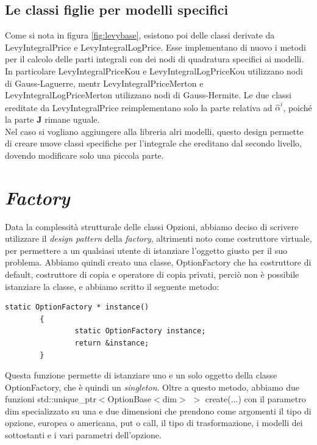 \documentclass[a4paper,10pt]{report}
\theoremstyle{plain}
\theoremstyle{definition}
\theoremstyle{remark}
\begin{document}
\subsection{Le classi figlie per modelli specifici}

Come si nota in figura \ref{fig:levybase}, esistono poi delle classi derivate da \textsf{LevyIntegralPrice} e \textsf{LevyIntegralLogPrice}. Esse implementano di nuovo i metodi per il calcolo delle parti integrali con dei nodi di quadratura specifici ai modelli. In particolare \textsf{LevyIntegralPriceKou} e \textsf{LevyIntegralLogPriceKou} utilizzano nodi di Gauss-Laguerre, mentr \textsf{LevyIntegralPriceMerton} e \textsf{LevyIntegralLogPriceMerton} utilizzano nodi di Gauss-Hermite. Le due classi ereditate da \textsf{LevyIntegralPrice} reimplementano solo la parte relativa ad $\hat{\alpha}^i$, poiché la parte $\mathbf{J}$ rimane uguale.\\

Nel caso si vogliano aggiungere alla libreria alri modelli, questo design permette di creare nuove classi specifiche per l'integrale che ereditano dal secondo livello, dovendo modificare solo una piccola parte.

\section{\emph{Factory}}
Data la complessit\`a strutturale delle classi Opzioni, abbiamo deciso di scrivere utilizzare il \emph{design pattern} della \emph{factory}, altrimenti noto come costruttore virtuale, per permettere a un qualsiasi utente di istanziare l'oggetto giusto per il suo problema. Abbiamo quindi creato una classe, \textsf{OptionFactory} che ha costruttore di default, costruttore di copia e operatore di copia privati, perci\`o non \`e possibile istanziare la classe, e abbiamo scritto il seguente metodo:
\begin{lstlisting}
static OptionFactory * instance()
        {
                static OptionFactory instance;
                return &instance;
        }
\end{lstlisting}
Questa funzione permette di istanziare uno e un solo oggetto della classe \textsf{OptionFactory}, che \`e quindi un \emph{singleton}. Oltre a questo metodo, abbiamo due funzioni \textsf{std::unique\_ptr$<$OptionBase$<$dim$>$ $>$ create(...)} con il parametro \textsf{dim} specializzato su una e due dimensioni che prendono come argomenti il tipo di opzione, europea o americana, put o call, il tipo di trasformazione, i modelli dei sottostanti e i vari parametri dell'opzione.
\end{document}

